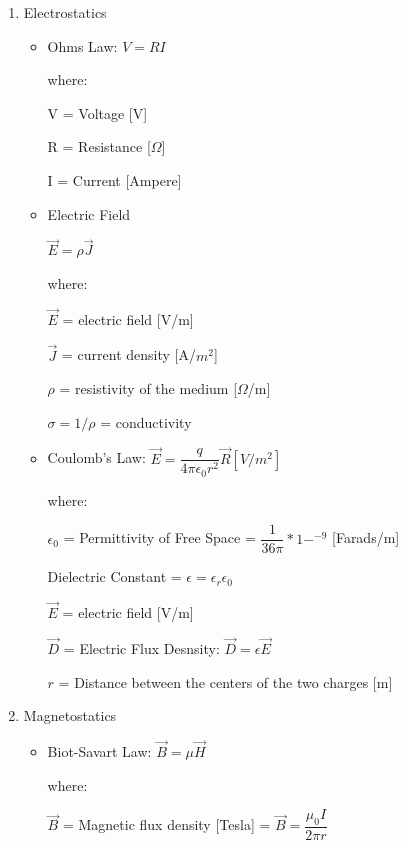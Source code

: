 \documentclass[10pt]{article}
\renewcommand{\frac}{\dfrac}
\begin{document}
\begin{enumerate}

	\item Electrostatics
	
	\begin{itemize}
	
		\item Ohms Law: $V = RI$
	
		where:
		
		V = Voltage [V]
		
		R = Resistance [$\Omega$]
		
		I = Current [Ampere]
		
		\item Electric Field
		
		$\vec{E} = \rho \vec{J}$
		
		where: 
		
		$\vec{E}$ = electric field [V/m]
		
		$\vec{J}$ = current density [A/$m^2$]
		
		$\rho$ = resistivity of the medium [$\Omega$/m]
		
		$\sigma = 1/\rho$ = conductivity 
		
		
		
		\item Coulomb's Law: $\vec{E} =  \frac{q}{4\pi \epsilon_0 r^2}\vec{R} [V/m^2]$

		where:

		$\epsilon_0$ = Permittivity of Free Space  = $\frac{1}{36\pi}*1-^{-9}$ [Farads/m]

		Dielectric Constant = $\epsilon = \epsilon_r \epsilon_0$
		
		$\vec{E}$ = electric field [V/m]
		
		$\vec{D}$ = Electric Flux Desnsity: $\vec{D} = \epsilon \vec{E}$
		
		

		$r$ = Distance between the centers of the two charges [m]
		
		\end{itemize}
		
	\item Magnetostatics
		\begin{itemize}

		\item Biot-Savart Law: $\vec{B} = \mu \vec{H}$

		where:

		$\vec{B}$ = Magnetic flux density [Tesla] = $\vec{B} = \frac{\mu_0 I}{2\pi r}$
		

\end{itemize}
\end{enumerate}
\end{document}
